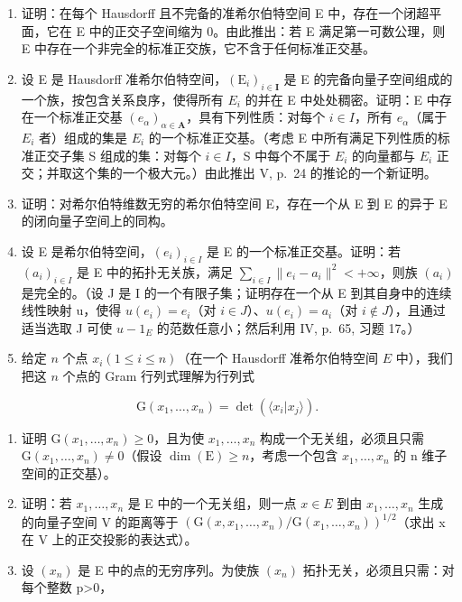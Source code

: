 \begin{enumerate}
\def\labelenumi{\arabic{enumi})}
\setcounter{enumi}{2}
\item
  证明：在每个 Hausdorff 且不完备的准希尔伯特空间 E 中，存在一个闭超平面，它在 E 中的正交子空间缩为 0。由此推出：若 E 满足第一可数公理，则 E 中存在一个非完全的标准正交族，它不含于任何标准正交基。
\item
  设 E 是 Hausdorff 准希尔伯特空间，\((\mathrm{E}_{i})_{i\in\mathbf{I}}\) 是 E 的完备向量子空间组成的一个族，按包含关系良序，使得所有 \(E_{i}\) 的并在 E 中处处稠密。证明：E 中存在一个标准正交基 \((e_{\alpha})_{\alpha\in\mathbf{A}}\)，具有下列性质：对每个 \(i\in I\)，所有 \(e_{\alpha}\)（属于 \(E_{i}\) 者）组成的集是 \(E_{i}\) 的一个标准正交基。（考虑 E 中所有满足下列性质的标准正交子集 S 组成的集：对每个 \(i\in I\)，S 中每个不属于 \(E_{i}\) 的向量都与 \(E_{i}\) 正交；并取这个集的一个极大元。）由此推出 V, p.~24 的推论的一个新证明。
\item
  证明：对希尔伯特维数无穷的希尔伯特空间 E，存在一个从 E 到 E 的异于 E 的闭向量子空间上的同构。
\item
  设 E 是希尔伯特空间，\((e_{i})_{i\in I}\) 是 E 的一个标准正交基。证明：若 \((a_{i})_{i\in I}\) 是 E 中的拓扑无关族，满足 \(\sum_{i\in I}\|e_{i}-a_{i}\|^{2}<+\infty\)，则族 \((a_{i})\) 是完全的。（设 J 是 I 的一个有限子集；证明存在一个从 E 到其自身中的连续线性映射 u，使得 \(u(e_{i})=e_{i}\)（对 \(i\in J\)）、\(u(e_{i})=a_{i}\)（对 \(i\notin J\)），且通过适当选取 J 可使 \(u-1_{E}\) 的范数任意小；然后利用 IV, p.~65, 习题 17。）
\item
  给定 \(n\) 个点 \(x_{i} (1 \leqslant i \leqslant n)\)（在一个 Hausdorff 准希尔伯特空间 \(E\) 中），我们把这 \(n\) 个点的 Gram 行列式理解为行列式
\end{enumerate}

\[
\mathrm{G} (x _ {1}, \dots , x _ {n}) = \det (\langle x _ {i} | x _ {j} \rangle).
\]

\begin{enumerate}
\def\labelenumi{\alph{enumi})}
\tightlist
\item
  证明 \(\mathrm{G}(x_{1},\ldots,x_{n})\geqslant0\)，且为使 \(x_{1},\ldots,x_{n}\) 构成一个无关组，必须且只需 \(\mathrm{G}(x_{1},\ldots,x_{n})\neq0\)（假设 \(\dim(\mathrm{E})\geqslant n\)，考虑一个包含 \(x_{1},\ldots,x_{n}\) 的 n 维子空间的正交基）。
\item
  证明：若 \(x_{1},\ldots,x_{n}\) 是 E 中的一个无关组，则一点 \(x\in E\) 到由 \(x_{1},\ldots,x_{n}\) 生成的向量子空间 V 的距离等于 \((\mathrm{G}(x,x_{1},\ldots,x_{n})/\mathrm{G}(x_{1},\ldots,x_{n}))^{1/2}\)（求出 x 在 V 上的正交投影的表达式）。
\item
  设 \((x_{n})\) 是 E 中的点的无穷序列。为使族 \((x_{n})\) 拓扑无关，必须且只需：对每个整数 p\textgreater0，
\end{enumerate}


